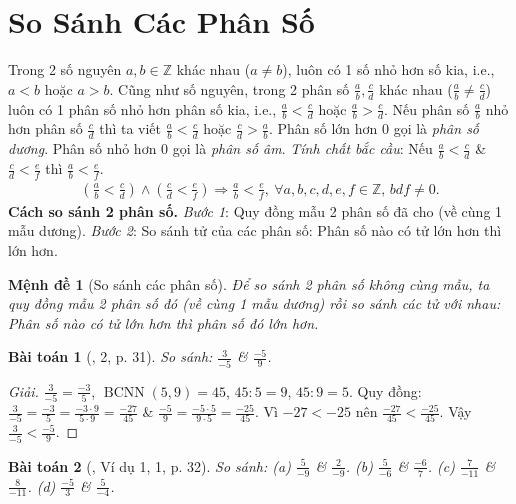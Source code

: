 \documentclass{article}
\newtheorem{baitoan}{Bài toán}
\newtheorem{menhde}{Mệnh đề}
\begin{document}

\section{So Sánh Các Phân Số}
Trong 2 số nguyên $a,b\in\mathbb{Z}$ khác nhau ($a\ne b$), luôn có 1 số nhỏ hơn số kia, i.e., $a < b$ hoặc $a > b$. Cũng như số nguyên, trong 2 phân số $\frac{a}{b},\frac{c}{d}$ khác nhau ($\frac{a}{b}\ne\frac{c}{d}$) luôn có 1 phân số nhỏ hơn phân số kia, i.e., $\frac{a}{b} < \frac{c}{d}$ hoặc $\frac{a}{b} > \frac{c}{d}$. Nếu phân số $\frac{a}{b}$ nhỏ hơn phân số $\frac{c}{d}$ thì ta viết $\frac{a}{b} < \frac{c}{d}$ hoặc $\frac{c}{d} > \frac{a}{b}$. Phân số lớn hơn $0$ gọi là \textit{phân số dương}. Phân số nhỏ hơn $0$ gọi là \textit{phân số âm}. \textit{Tính chất bắc cầu}: Nếu $\frac{a}{b} < \frac{c}{d}$ \& $\frac{c}{d} < \frac{e}{f}$ thì $\frac{a}{b} < \frac{e}{f}$.
\begin{align*}
	\left(\frac{a}{b} < \frac{c}{d}\right)\land\left(\frac{c}{d} < \frac{e}{f}\right)\Rightarrow\frac{a}{b} < \frac{e}{f},\ \forall a,b,c,d,e,f\in\mathbb{Z},\,bdf\ne0.
\end{align*}
\textbf{Cách so sánh 2 phân số.} \textit{Bước 1}: Quy đồng mẫu 2 phân số đã cho (về cùng 1 mẫu dương). \textit{Bước 2}: So sánh tử của các phân số: Phân số nào có tử lớn hơn thì lớn hơn.

\begin{menhde}[So sánh các phân số]
	Để so sánh 2 phân số không cùng mẫu, ta quy đồng mẫu 2 phân số đó (về cùng 1 mẫu dương) rồi so sánh các tử với nhau: Phân số nào có tử lớn hơn thì phân số đó lớn hơn.
\end{menhde}

\begin{baitoan}[\cite{SGK_Toan_6_Canh_Dieu_tap_2}, 2, p. 31]
	So sánh: $\frac{3}{-5}$ \& $\frac{-5}{9}$.
\end{baitoan}

\begin{proof}[Giải]
	$\frac{3}{-5} = \frac{-3}{5}$, $\operatorname{BCNN}(5,9) = 45$, $45:5 = 9$, $45:9 = 5$. Quy đồng: $\frac{3}{-5} =\frac{-3}{5} = \frac{-3\cdot9}{5\cdot9} = \frac{-27}{45}$ \& $\frac{-5}{9} = \frac{-5\cdot5}{9\cdot5} = \frac{-25}{45}$. Vì $-27 < -25$ nên $\frac{-27}{45} < \frac{-25}{45}$. Vậy $\frac{3}{-5} < \frac{-5}{9}$.
\end{proof}

\begin{baitoan}[\cite{SGK_Toan_6_Canh_Dieu_tap_2}, Ví dụ 1, 1, p. 32]
	 So sánh: (a) $\frac{5}{-9}$ \& $\frac{2}{-9}$. (b) $\frac{5}{-6}$ \& $\frac{-6}{7}$. (c) $\frac{7}{-11}$ \& $\frac{8}{-11}$. (d) $\frac{-5}{3}$ \& $\frac{5}{-4}$.
\end{baitoan}
\end{document}
